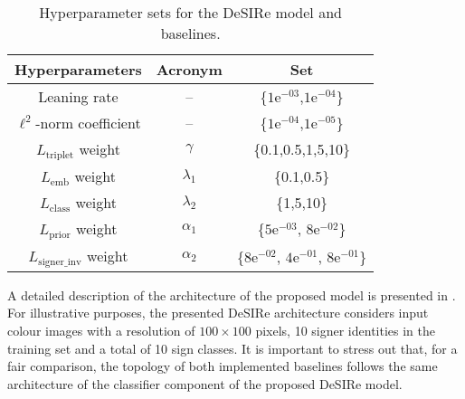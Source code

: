\begin{table}[t]
    \centering
        \begin{tabular}{c|c|c}
            Hyperparameters                    & Acronym & Set                \\\hline
            Leaning rate                                & --       & \{$1\text{e}^{-03}$,$1\text{e}^{-04}$\}             \\
            $\ell^2$-norm coefficient                              & --      & \{$1\text{e}^{-04}$,$1\text{e}^{-05}$\}             \\
            $L_{\text{triplet}}$ weight                 & $\gamma$                & \{0.1,0.5,1,5,10\}                  \\
            $L_{\text{emb}}$ weight                 & $\lambda_{1}$                & \{0.1,0.5\}                  \\
            $L_{\text{class}}$ weight                 & $\lambda_{2}$                & \{1,5,10\}                  \\
            $L_{\text{prior}}$ weight                 & $\alpha_{1}$                & \{$5\text{e}^{-03}$, $8\text{e}^{-02}$\}                  \\
            $L_{\text{signer\_inv}}$ weight                 & $\alpha_{2}$                & \{$8\text{e}^{-02}$, $4\text{e}^{-01}$, $8\text{e}^{-01}$\}                  \\
        \end{tabular}
    \caption{Hyperparameter sets for the DeSIRe model and baselines.}
    \label{tab:desire_hyperparam}
\end{table}


A detailed description of the architecture of the proposed model is presented in . For illustrative purposes, the presented DeSIRe architecture considers input colour images with a resolution of $100\times 100$ pixels, 10 signer identities in the training set and a total of 10 sign classes. It is important to stress out that, for a fair comparison, the topology of both implemented baselines follows the same architecture of the classifier component of the proposed DeSIRe model.

